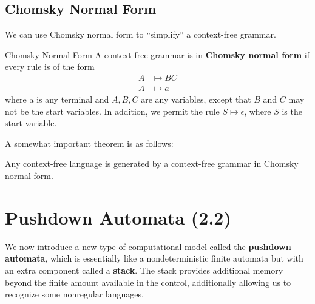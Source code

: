 \documentclass[letterpaper]{article}
\begin{document}
\subsection{Chomsky Normal Form}
We can use Chomsky normal form to ``simplify'' a context-free grammar. 
\begin{definition}{Chomsky Normal Form}{}
    A context-free grammar is in \textbf{Chomsky normal form} if every rule is of the form 
    \begin{equation*}
        \begin{aligned}
            A &\mapsto BC \\ 
            A &\mapsto a
        \end{aligned}
    \end{equation*}
    where a is any terminal and $A, B, C$ are any variables, except that $B$ and $C$ may not be the start variables. In addition, we permit the rule $S \mapsto \epsilon$, where $S$ is the start variable.  
\end{definition}

A somewhat important theorem is as follows:
\begin{theorem}{}{}
    Any context-free language is generated by a context-free grammar in Chomsky normal form. 
\end{theorem}









































\newpage 
\section{Pushdown Automata (2.2)}
We now introduce a new type of computational model called the \textbf{pushdown automata}, which is essentially like a nondeterministic finite automata but with an extra component called a \textbf{stack}. The stack provides additional memory beyond the finite amount available in the control, additionally allowing us to recognize some nonregular languages. 
\end{document}
